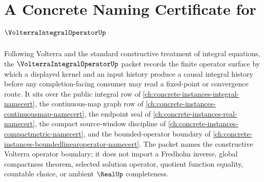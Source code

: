 \chapter{A Concrete Naming Certificate for $\VolterraIntegralOperatorUp$}
\label{ch:concrete-instances-volterra-integral-operator-namecert}

Following Volterra and the standard constructive treatment of integral equations, the $\VolterraIntegralOperatorUp$ packet records the finite operator surface by which a displayed kernel and an input history produce a causal integral history before any completion-facing consumer may read a fixed-point or convergence route. It sits over the public integral row of \autoref{ch:concrete-instances-integral-namecert}, the continuous-map graph row of \autoref{ch:concrete-instances-continuousmap-namecert}, the endpoint seal of \autoref{ch:concrete-instances-real-namecert}, the compact source-window discipline of \autoref{ch:concrete-instances-compactmetric-namecert}, and the bounded-operator boundary of \autoref{ch:concrete-instances-boundedlinearoperator-namecert}. The packet names the constructive Volterra operator boundary; it does not import a Fredholm inverse, global compactness theorem, selected solution operator, quotient function equality, countable choice, or ambient $\RealUp$ completeness.


